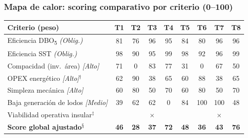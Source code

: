 \documentclass[aspectratio=169]{beamer}
\newcommand{\cmarks}{\textcolor{verdebueno}{\checkmark}}
\newcommand{\xmark}{\textcolor{rojomalo}{$\times$}}
\begin{document}
\begin{frame}
\frametitle{Mapa de calor: scoring comparativo por criterio (0--100)}
\centering
\scriptsize
\renewcommand{\arraystretch}{1.3}
\begin{tabular}{l*{8}{c}}
\toprule
\textbf{Criterio (peso)} & \textbf{T1} & \textbf{T2} & \textbf{T3} & \textbf{T4} & \textbf{T5} & \textbf{T6} & \textbf{T7} & \textbf{T8} \\
\midrule
Eficiencia DBO\textsubscript{5} \textit{(Oblig.)} & \cellcolor{verdebueno!81}81 & \cellcolor{verdebueno!76}76 & \cellcolor{verdebueno!96}96 & \cellcolor{verdebueno!95}95 & \cellcolor{verdebueno!84}84 & \cellcolor{verdebueno!80}80 & \cellcolor{verdebueno!96}96 & \cellcolor{verdebueno!96}96 \\
Eficiencia SST \textit{(Oblig.)} & \cellcolor{verdebueno!98}98 & \cellcolor{verdebueno!90}90 & \cellcolor{verdebueno!95}95 & \cellcolor{verdebueno!99}99 & \cellcolor{verdebueno!98}98 & \cellcolor{verdebueno!92}92 & \cellcolor{verdebueno!96}96 & \cellcolor{verdebueno!99}99 \\
Compacidad (inv.\ \'{a}rea) \textit{[Alto]} & \cellcolor{amarillomedio!71}71 & \cellcolor{rojomalo!0}0 & \cellcolor{verdebueno!83}83 & \cellcolor{verdebueno!77}77 & \cellcolor{amarillomedio!31}31 & \cellcolor{rojomalo!0}0 & \cellcolor{verdebueno!67}67 & \cellcolor{amarillomedio!50}50 \\
OPEX energ\'{e}tico \textit{[Alto]}$^\dagger$ & \cellcolor{amarillomedio!62}62 & \cellcolor{verdebueno!90}90 & \cellcolor{rojomalo!38}38 & \cellcolor{amarillomedio!65}65 & \cellcolor{amarillomedio!60}60 & \cellcolor{verdebueno!88}88 & \cellcolor{rojomalo!38}38 & \cellcolor{amarillomedio!65}65 \\
Simpleza mec\'{a}nica \textit{[Alto]} & \cellcolor{amarillomedio!60}60 & \cellcolor{verdebueno!80}80 & \cellcolor{amarillomedio!50}50 & \cellcolor{verdebueno!70}70 & \cellcolor{amarillomedio!60}60 & \cellcolor{verdebueno!80}80 & \cellcolor{amarillomedio!50}50 & \cellcolor{verdebueno!70}70 \\
Baja generaci\'{o}n de lodos \textit{[Medio]} & \cellcolor{amarillomedio!39}39 & \cellcolor{amarillomedio!62}62 & \cellcolor{amarillomedio!62}62 & \cellcolor{rojomalo!0}0 & \cellcolor{verdebueno!84}84 & \cellcolor{verdebueno!100}100 & \cellcolor{verdebueno!100}100 & \cellcolor{amarillomedio!48}48 \\
\midrule
Viabilidad operativa insular$^\ddagger$ & \cmarks & \cmarks & \xmark & \cmarks & \cmarks & \cmarks & \xmark & \cmarks \\
\midrule
\textbf{Score global ajustado}$^\mathsection$ & \cellcolor{amarillomedio!46}\textbf{46} & \cellcolor{rojomalo!28}\textbf{28} & \cellcolor{amarillomedio!37}\textbf{37} & \cellcolor{verdebueno!72}\textbf{72} & \cellcolor{amarillomedio!48}\textbf{48} & \cellcolor{rojomalo!36}\textbf{36} & \cellcolor{amarillomedio!43}\textbf{43} & \cellcolor{verdebueno!76}\textbf{76} \\
\bottomrule
\end{tabular}


\end{frame}
\end{document}
